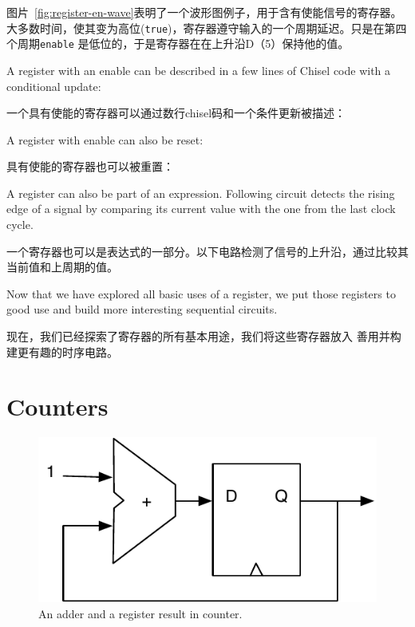 \documentclass[%
    10pt,
    headinclude, footexclude,
    openright, %
    notitlepage,
    cleardoubleempty,
    headsepline,
    pointlessnumbers,
    bibtotoc, idxtotoc,
    ]{scrbook}
\newcommand{\code}[1]{{\small{\texttt{#1}}}}
\newcommand{\scale}{0.7}
\begin{document}
图片~\ref{fig:register-en-wave}表明了一个波形图例子，用于含有使能信号的寄存器。
大多数时间，使其变为高位(\code{true})，寄存器遵守输入的一个周期延迟。只是在第四个周期\code{enable}
是低位的，于是寄存器在在上升沿D（5）保持他的值。

A register with an enable can be described in a few lines of Chisel code
with a conditional update:

一个具有使能的寄存器可以通过数行chisel码和一个条件更新被描述：


\noindent A register with enable can also be reset:

\noindent 具有使能的寄存器也可以被重置：


A register can also be part of an expression. Following circuit detects the rising edge
of a signal by comparing its current value with the one from the last clock cycle.

一个寄存器也可以是表达式的一部分。以下电路检测了信号的上升沿，通过比较其当前值和上周期的值。


Now that we have explored all basic uses of a register, we put those registers to
good use and build more interesting sequential circuits.


现在，我们已经探索了寄存器的所有基本用途，我们将这些寄存器放入
善用并构建更有趣的时序电路。

\section{Counters}
\label{sec:counter}

\begin{figure}
  \centering
  \includegraphics[scale=\scale]{figures/counter}
  \caption{An adder and a register result in counter.}
  \label{fig:counter}
\end{figure}
\end{document}
